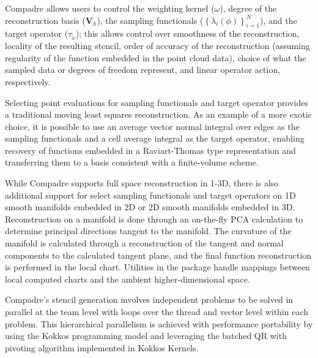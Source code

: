 Compadre allows users to control the weighting kernel ($\omega$), degree of the reconstruction basis ($\mathbf{V}_h$), the sampling functionals ($ \left\{\lambda_i(\phi)\right\}_{i=1}^{N}$), and the target operator ($\tau_{\tilde{x}}$); this allows control over smoothness of the reconstruction, locality of the resulting stencil, order of accuracy of the reconstruction (assuming regularity of the function embedded in the point cloud data), choice of what the sampled data or degrees of freedom represent, and linear operator action, respectively.

Selecting point evaluations for sampling functionals and target operator provides a traditional moving least squares reconstruction. As an example of a more exotic choice, it is possible to use an average vector normal integral over edges as the sampling functionals and a cell average integral as the target operator, enabling recovery of functions embedded in a Raviart-Thomas type representation and transferring them to a basis consistent with a finite-volume scheme.

While Compadre supports full space reconstruction in 1-3D, there is also additional support for select sampling functionals and target operators on 1D smooth manifolds embedded in 2D or 2D smooth manifolds embedded in 3D. Reconstruction on a manifold is done through an on-the-fly PCA calculation to determine principal directions tangent to the manifold. The curvature of the manifold is calculated through a reconstruction of the tangent and normal components to the calculated tangent plane, and the final function reconstruction is performed in the local chart. Utilities in the package handle mappings between local computed charts and the ambient higher-dimensional space.

Compadre's stencil generation involves independent problems to be solved in parallel at the team level with loops over the thread and vector level within each problem. This hierarchical parallelism is achieved with performance portability by using the Kokkos programming model and leveraging the batched QR with pivoting algorithm implemented in Kokkos Kernels.
